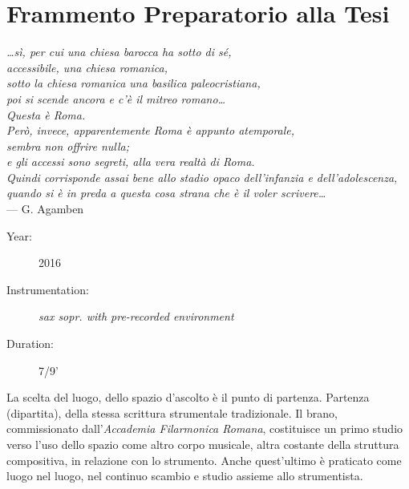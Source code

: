 
\section*{Frammento Preparatorio alla Tesi}
\label{sec:frammento}

\begin{flushright}{\slshape
  …sì, per cui una chiesa barocca ha sotto di sé, \\
  accessibile, una chiesa romanica, \\
  sotto la chiesa romanica una basilica paleocristiana, \\
  poi si scende ancora e c’è il mitreo romano… \\
  Questa è Roma. \\
  Però, invece, apparentemente Roma è appunto atemporale, \\
  sembra non offrire nulla; \\
  e gli accessi sono segreti, alla vera realtà di Roma. \\
  Quindi corrisponde assai bene allo stadio opaco dell’infanzia e dell’adolescenza, \\
  quando si è in preda a questa cosa strana che è il voler scrivere…} \\ \medskip
    --- G. Agamben
\end{flushright}

\begin{description}
  \item[Year:] 2016
  \item[Instrumentation:] \emph {sax sopr. with pre-recorded environment}
  \item[Duration:] 7/9'
\end{description}



La scelta del luogo, dello spazio d'ascolto è il punto di partenza.
Partenza (dipartita), della stessa scrittura strumentale tradizionale.
Il brano, commissionato dall'\emph{Accademia Filarmonica Romana}, costituisce un primo studio
verso l'uso dello spazio come altro corpo musicale, altra costante della struttura
compositiva, in  relazione con lo strumento.
Anche quest'ultimo è praticato come luogo nel luogo, nel continuo scambio e
studio assieme allo strumentista.


